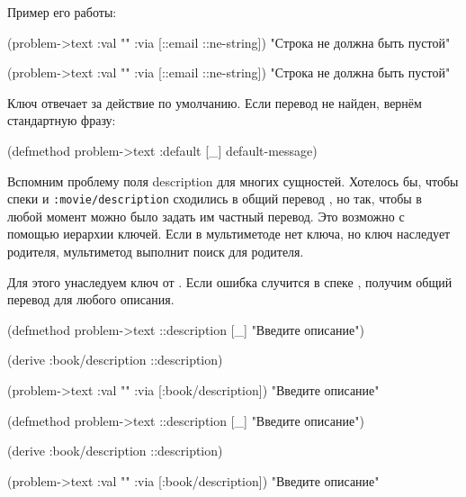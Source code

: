 \noindent
Пример его работы:

\ifnarrow

\begin{clojure}
(problem->text
  {:val "" :via [::email ::ne-string]})
"Строка не должна быть пустой"
\end{clojure}

\else

\begin{clojure}
(problem->text {:val "" :via [::email ::ne-string]})
"Строка не должна быть пустой"
\end{clojure}

\fi

Ключ  отвечает за действие по умолчанию. Если перевод не
найден, вернём стандартную фразу:


\begin{clojure}
(defmethod problem->text :default [_]
  default-message)
\end{clojure}



Вспомним проблему поля description для многих сущностей. Хотелось бы, чтобы
спеки  и \texttt{:movie/\-descrip\-tion} сходились в общий
перевод , но так, чтобы в любой момент можно было задать им
частный перевод. Это возможно с помощью иерархии ключей. Если в мультиметоде нет
ключа, но ключ наследует родителя, мультиметод выполнит поиск для родителя.

Для этого унаследуем ключ  от
. Если ошибка случится в спеке ,
получим общий перевод для любого описания.


\ifnarrow

\begin{clojure}
(defmethod problem->text
  ::description [_] "Введите описание")

(derive :book/description ::description)

(problem->text
  {:val "" :via [:book/description]})
"Введите описание"
\end{clojure}

\else

\begin{clojure}
(defmethod problem->text ::description [_]
  "Введите описание")

(derive :book/description ::description)

(problem->text {:val "" :via [:book/description]})
"Введите описание"
\end{clojure}

